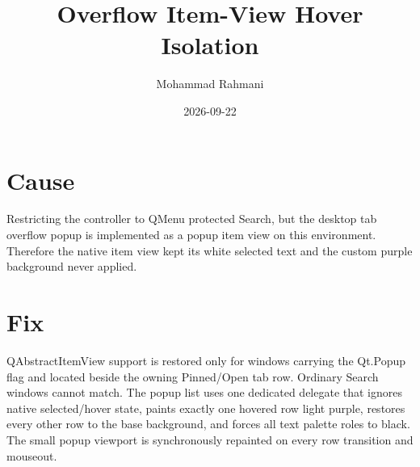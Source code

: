 \documentclass[a4paper]{article}
\title{Overflow Item-View Hover Isolation}
\date{2026-09-22}
\author{Mohammad Rahmani}
\begin{document}
   \maketitle

   \begin{preview}
      \section{Cause}
      Restricting the controller to QMenu protected Search, but the desktop tab
      overflow popup is implemented as a popup item view on this environment.
      Therefore the native item view kept its white selected text and the
      custom purple background never applied.

      \section{Fix}
      QAbstractItemView support is restored only for windows carrying the
      Qt.Popup flag and located beside the owning Pinned/Open tab row. Ordinary
      Search windows cannot match. The popup list uses one dedicated delegate
      that ignores native selected/hover state, paints exactly one hovered row
      light purple, restores every other row to the base background, and forces
      all text palette roles to black. The small popup viewport is synchronously
      repainted on every row transition and mouseout.
   \end{preview}

   
   
\end{document}
